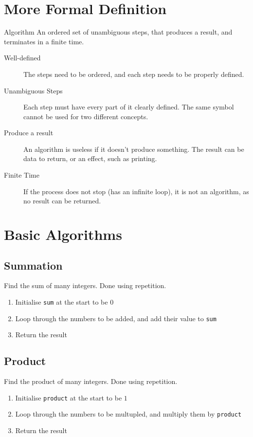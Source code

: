 \documentclass[\main/notes.tex]{subfiles}
\begin{document}
		\section{More Formal Definition}
			\begin{definition}{Algorithm}
				An ordered set of unambiguous steps, that produces a result, and terminates in a finite time.
				\begin{indentparagraph}
					\begin{description}
						\item[Well-defined] The steps need to be ordered, and each step needs to be properly defined.
						\item[Unambiguous Steps] Each step must have every part of it clearly defined. The same symbol cannot be used for two different concepts.
						\item[Produce a result] An algorithm is useless if it doesn't produce something. The result can be data to return, or an effect, such as printing.
						\item[Finite Time] If the process does not stop (has an infinite loop), it is not an algorithm, as no result can be returned.
					\end{description}
				\end{indentparagraph}
			\end{definition}
		\section{Basic Algorithms}
			\subsection{Summation}
				Find the sum of many integers. Done using repetition.
				\begin{enumerate}[nosep]
					\item Initialise \texttt{sum} at the start to be $0$
					\item Loop through the numbers to be added, and add their value to \texttt{sum}
					\item Return the result
				\end{enumerate}
			\subsection{Product}
				Find the product of many integers. Done using repetition.
				\begin{enumerate}[nosep]
					\item Initialise \texttt{product} at the start to be $1$
					\item Loop through the numbers to be multupled, and multiply them by \texttt{product}
					\item Return the result
				\end{enumerate}
\end{document}
